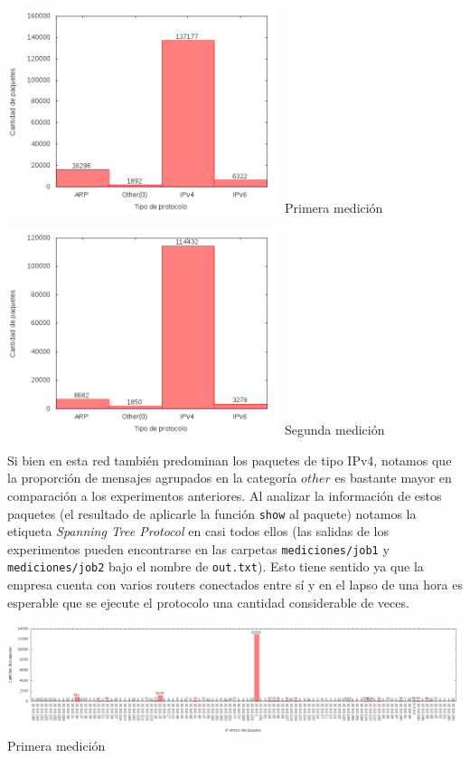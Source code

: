 \begin{minipage}{8cm}
  \centering
  \includegraphics[width=8cm]{../mediciones/job1/type.png}
  Primera medición
\end{minipage}%
\begin{minipage}{8cm}
  \centering
  \includegraphics[width=8cm]{../mediciones/job2/type.png}
  Segunda medición
\end{minipage}

Si bien en esta red también predominan los paquetes de tipo IPv4, notamos que la proporción de mensajes agrupados en
la categoría $other$ es bastante mayor en comparación a los experimentos anteriores. Al analizar la información de
estos paquetes (el resultado de aplicarle la función \texttt{show} al paquete) notamos la etiqueta \textit{Spanning
Tree Protocol} en casi todos ellos (las salidas de los experimentos pueden encontrarse en las carpetas
\texttt{mediciones/job1} y \texttt{mediciones/job2} bajo el nombre de \texttt{out.txt}). Esto tiene sentido ya que
la empresa cuenta con varios routers conectados entre sí y en el lapso de una hora es esperable que se ejecute el
protocolo una cantidad considerable de veces.

\begin{center}
\includegraphics[width=16cm]{../mediciones/job1/src.png}
Primera medición
\end{center}

